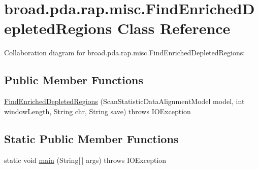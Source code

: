 \hypertarget{classbroad_1_1pda_1_1rap_1_1misc_1_1_find_enriched_depleted_regions}{\section{broad.\+pda.\+rap.\+misc.\+Find\+Enriched\+Depleted\+Regions Class Reference}
\label{classbroad_1_1pda_1_1rap_1_1misc_1_1_find_enriched_depleted_regions}
}


Collaboration diagram for broad.\+pda.\+rap.\+misc.\+Find\+Enriched\+Depleted\+Regions\+:
\subsection*{Public Member Functions}
\begin{DoxyCompactItemize}
\item 
\hyperlink{classbroad_1_1pda_1_1rap_1_1misc_1_1_find_enriched_depleted_regions_a2da51a7a6299da78e842757129c2c09d}{Find\+Enriched\+Depleted\+Regions} (Scan\+Statistic\+Data\+Alignment\+Model model, int window\+Length, String chr, String save)  throws I\+O\+Exception
\end{DoxyCompactItemize}
\subsection*{Static Public Member Functions}
\begin{DoxyCompactItemize}
\item 
static void \hyperlink{classbroad_1_1pda_1_1rap_1_1misc_1_1_find_enriched_depleted_regions_ac3175e1af75f2f64d9ca6b678c2440dc}{main} (String\mbox{[}$\,$\mbox{]} args)  throws I\+O\+Exception
\end{DoxyCompactItemize}


